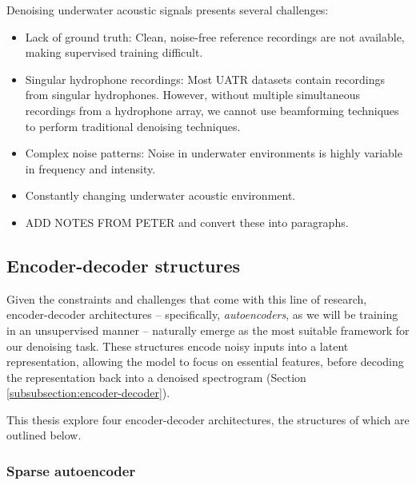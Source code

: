 Denoising underwater acoustic signals presents several challenges:
\begin{itemize}
    \item Lack of ground truth: Clean, noise-free reference recordings are not available, making supervised training difficult.
    \item Singular hydrophone recordings: Most UATR datasets contain recordings from singular hydrophones. However, without multiple simultaneous recordings from a hydrophone array, we cannot use beamforming techniques to perform traditional denoising techniques.
    \item Complex noise patterns: Noise in underwater environments is highly variable in frequency and intensity.
    \item Constantly changing underwater acoustic environment.
    \item ADD NOTES FROM PETER and convert these into paragraphs.
\end{itemize}



\subsection{Encoder-decoder structures}

Given the constraints and challenges that come with this line of research, encoder-decoder architectures -- specifically, \textit{autoencoders}, as we will be training in an unsupervised manner -- naturally emerge as the most suitable framework for our denoising task. These structures encode noisy inputs into a latent representation, allowing the model to focus on essential features, before decoding the representation back into a denoised spectrogram (Section \ref{subsubsection:encoder-decoder}). 

This thesis explore four encoder-decoder architectures, the structures of which are outlined below.

\subsubsection{Sparse autoencoder}

